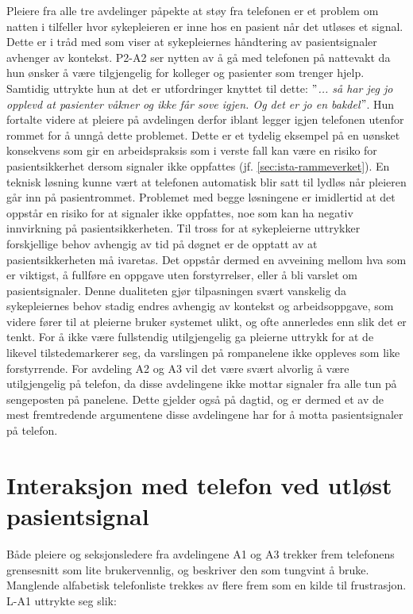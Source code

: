 \noindent
Pleiere fra alle tre avdelinger påpekte at støy fra telefonen er et problem om natten i tilfeller hvor sykepleieren er inne hos en pasient når det utløses et signal. Dette er i tråd med \citet{klemets13} som viser at sykepleiernes håndtering av pasientsignaler avhenger av kontekst. P2-A2 ser nytten av å gå med telefonen på nattevakt da hun ønsker å være tilgjengelig for kolleger og pasienter som trenger hjelp. Samtidig uttrykte hun at det er utfordringer knyttet til dette: \textit{ $"$... så har jeg jo opplevd at pasienter våkner og ikke får sove igjen. Og det er jo en bakdel$"$}. Hun fortalte videre at pleiere på avdelingen derfor iblant legger igjen telefonen utenfor rommet for å unngå dette problemet. Dette er et tydelig eksempel på en uønsket konsekvens som gir en arbeidspraksis som i verste fall kan være en risiko for pasientsikkerhet dersom signaler ikke oppfattes (jf. \ref{sec:ista-rammeverket}). En teknisk løsning kunne vært at telefonen automatisk blir satt til lydløs når pleieren går inn på pasientrommet. Problemet med begge løsningene er imidlertid at det oppstår en risiko for at signaler ikke oppfattes, noe som kan ha negativ innvirkning på pasientsikkerheten. Til tross for at sykepleierne uttrykker forskjellige behov avhengig av tid på døgnet er de opptatt av at pasientsikkerheten må ivaretas. Det oppstår dermed en avveining mellom hva som er viktigst, å fullføre en oppgave uten forstyrrelser, eller å bli varslet om pasientsignaler. Denne dualiteten gjør tilpasningen svært vanskelig da sykepleiernes behov stadig endres avhengig av kontekst og arbeidsoppgave, som videre fører til at pleierne bruker systemet ulikt, og ofte annerledes enn slik det er tenkt. For å ikke være fullstendig utilgjengelig ga pleierne uttrykk for at de likevel tilstedemarkerer seg, da varslingen på rompanelene ikke oppleves som like forstyrrende. For avdeling A2 og A3 vil det være svært alvorlig å være utilgjengelig på telefon, da disse avdelingene ikke mottar signaler fra alle tun på sengeposten på panelene. Dette gjelder også på dagtid, og er dermed et av de mest fremtredende argumentene disse avdelingene har for å motta pasientsignaler på telefon. 

\section{Interaksjon med telefon ved utløst pasientsignal}
Både pleiere og seksjonsledere fra avdelingene A1 og A3 trekker frem telefonens grensesnitt som lite brukervennlig, og beskriver den som tungvint å bruke. Manglende alfabetisk telefonliste trekkes av flere frem som en kilde til frustrasjon. L-A1 uttrykte seg slik:

